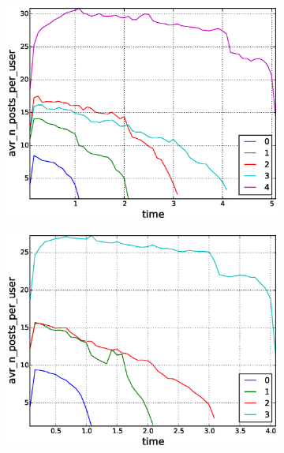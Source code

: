 \begin{figure}[!tb]
\centering
\begin{subfigure}{.3\textwidth}\includegraphics[scale=0.25]{./images/avr_posts_per_user_for_surviving_year_for_2010.eps}\caption{}\end{subfigure}
\begin{subfigure}{.3\textwidth}\includegraphics[scale=0.25]{./images/avr_posts_per_user_for_surviving_year_for_2011.eps}\caption{}\end{subfigure}

\end{figure}
